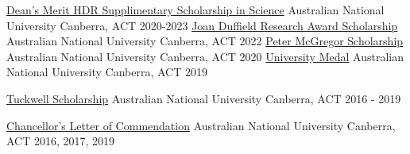 



\begin{cvhonors}

  \cvhonor
    {\href{https://study.anu.edu.au/scholarships/find-scholarship/deans-merit-hdr-supplementary-scholarship-science}{Dean’s Merit HDR Supplimentary Scholarship in Science}} %
    {Australian National University} %
    {Canberra, ACT} %
    {2020-2023} %
  \cvhonor
    {\href{https://study.anu.edu.au/scholarships/find-scholarship/joan-duffield-research-award}{Joan Duffield Research Award Scholarship}} %
    {Australian National University} %
    {Canberra, ACT} %
    {2022} %
  \cvhonor
    {\href{https://study.anu.edu.au/scholarships/find-scholarship/peter-mcgregor-hdr-supplementary-scholarship}{Peter McGregor Scholarship}} %
    {Australian National University} %
    {Canberra, ACT} %
    {2020} %
  \cvhonor
    {\href{https://www.anu.edu.au/students/program-administration/prizes/university-medal-and-postgraduate-medal-for-academic-excellence}{University Medal}} %
    {Australian National University} %
    {Canberra, ACT} %
    {2019} %

  \cvhonor
    {\href{https://tuckwell.anu.edu.au/}{Tuckwell Scholarship}} %
    {Australian National University} %
    {Canberra, ACT} %
    {2016 - 2019} %

    
  \cvhonor
    {\href{https://www.anu.edu.au/students/program-administration/prizes/chancellors-letters-of-commendation}{Chancellor's Letter of Commendation}} %
    {Australian National University} %
    {Canberra, ACT} %
    {2016, 2017, 2019} %


\end{cvhonors}
